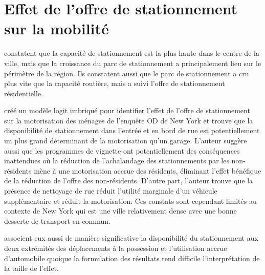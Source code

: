 \section{Effet de l'offre de stationnement sur la mobilité}
\textcite{Chester:ParkingInfrastructure:2015} constatent que la capacité de stationnement est la plus haute dans le centre de la ville, mais que la croissance du parc de stationnement a principalement lieu sur le périmètre de la région.  Ils constatent aussi que le parc de stationnement a cru plus vite que la capacité routière, mais a suivi l'offre de stationnement résidentielle.\par
\textcite{Guo:DoesResidential:2013} créé un modèle logit imbriqué pour identifier l'effet de l'offre de stationnement sur la motorisation des ménages de l'enquête OD de New York et trouve que la disponibilité de stationnement dans l'entrée et en bord de rue est potentiellement un plus grand déterminant de la motorisation qu'un garage. L'auteur suggère aussi que les programmes de vignette ont potentiellement des conséquences inattendues où la réduction de l'achalandage des stationnements par les non-résidents mène à une motorisation accrue des résidents, éliminant l'effet bénéfique de la réduction de l'offre des non-résidents. D'autre part, l'auteur trouve que la présence de nettoyage de rue réduit l'utilité marginale d'un véhicule supplémentaire et réduit la motorisation. Ces constats sont cependant limités au contexte de New York qui est une ville relativement dense avec une bonne desserte de transport en commun.\par
\textcite{Yin:BuiltEnvironment:2018a} associent eux aussi de manière significative la disponibilité du stationnement aux deux extrémités des déplacements à la possession et l'utilisation accrue d'automobile quoique la formulation des résultats rend difficile l'interprétation de la taille de l'effet.\par
